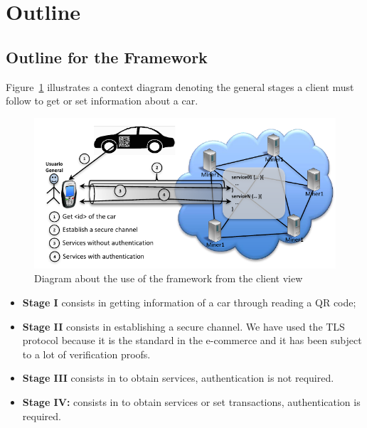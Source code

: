 \section{Outline}
\label{sec:outline}


\subsection{Outline for the Framework}
\label{subsec:proposal}
Figure~\ref{fig:flowChartFramework} illustrates a context diagram denoting
the general stages a client must follow to get or set information about a car. 
\begin{figure}[bt]
  \centering
    \includegraphics[scale=0.7]{images/gralScheme.pdf}
        \caption{Diagram about the use of the framework from the client view}
    \label{fig:flowChartFramework}
\end{figure}

\begin{itemize}
  \item \textbf{Stage I} consists in getting information of a car through reading
    a QR code;
  \item \textbf{Stage II} consists in establishing a secure channel. We
    have used the TLS protocol because it is the standard in the
    e-commerce and it has been subject to a lot of verification proofs.  
  \item \textbf{Stage III} consists in to obtain services, authentication
    is not required.   
  \item \textbf{Stage IV:} consists in to obtain services or set transactions, 
    authentication is required.  
\end{itemize}

